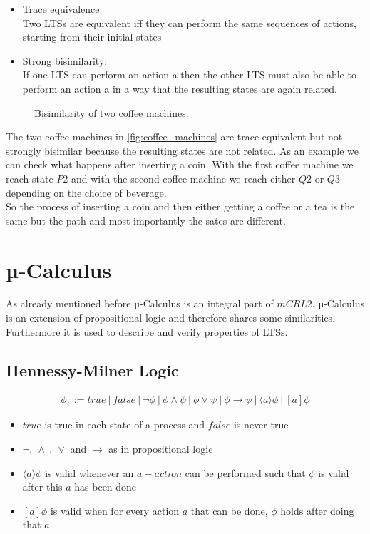 \documentclass{clseminar}
\begin{document}
  \begin{itemize}[noitemsep]
    \item Trace equivalence: \\
    Two LTSs are equivalent iff they can perform the same sequences of actions, starting from their initial states \\
    \item Strong bisimilarity: \\
    If one LTS can perform an action a then the other LTS must also be able to perform an action a in a way that the resulting states are again related. \\
  \end{itemize}

  \begin{figure}[!ht]
    \resizebox{\textwidth}{!}{}
    \caption{Bisimilarity of two coffee machines.}
    \label{fig:coffee_machines}
  \end{figure}

  The two coffee machines in \autoref{fig:coffee_machines} are trace equivalent but not strongly bisimilar because the resulting states are not related. As an example we can check what happens after inserting a coin. With the first coffee machine we reach state $P2$ and with the second coffee machine we reach either $Q2$ or $Q3$ depending on the choice of beverage.\\
  So the process of inserting a coin and then either getting a coffee or a tea is the same but the path and most importantly the sates are different.

  \section{µ-Calculus}
  As already mentioned before µ-Calculus is an integral part of $mCRL2$. µ-Calculus is an extension of propositional logic and therefore shares some similarities. \\
  Furthermore it is used to describe and verify properties of LTSs.

  \subsection{Hennessy-Milner Logic}
  \begin{align*}
    \phi ::= \mathit{true}\ |\ \mathit{false}\ |\ \neg \phi\ |\ \phi \land \psi\ |\ \phi \lor \psi\ |\ \phi \to \psi\ |\ \langle a \rangle \phi \ |\ [a]\phi
  \end{align*}
  \begin{itemize}
    \item $\mathit{true}$ is true in each state of a process and $\mathit{false}$ is never true
    \item $\neg ,\ \land\ ,\ \lor$ and $\to$ as in propositional logic
    \item $\langle a \rangle \phi$ is valid whenever an $a-action$ can be performed such that $\phi$ is valid after this $a$ has been done
    \item $[a]\phi$ is valid when for every action $a$ that can be done, $\phi$ holds after doing that $a$
  \end{itemize}
\end{document}

